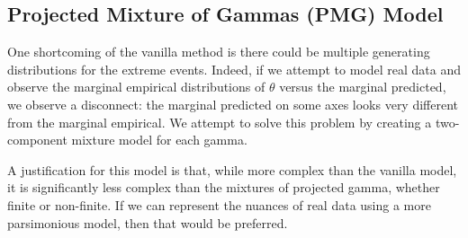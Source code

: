 
\subsection{Projected Mixture of Gammas (PMG) Model}
\label{method:pmg}
One shortcoming of the vanilla method is there could be multiple
  generating distributions for the extreme events.  Indeed, if we attempt to
  model real data and observe the marginal empirical distributions of $\theta$
  versus the marginal predicted, we observe a disconnect: the marginal predicted
  on some axes looks very different from the marginal empirical.  We attempt to
  solve this problem by creating a two-component mixture model for each gamma.

A justification for this model is that, while more complex than the vanilla model,
  it is significantly less complex than the mixtures of projected gamma, whether
  finite or non-finite.  If we can represent the nuances of real data using a more
  parsimonious model, then that would be preferred.

